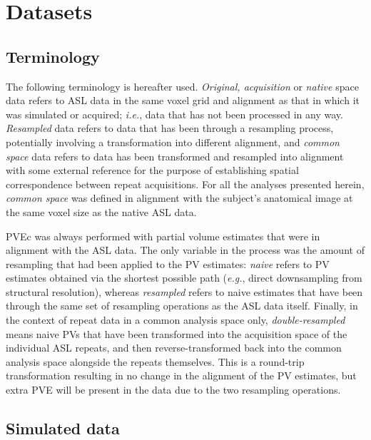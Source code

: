 \section{Datasets}

\subsection{Terminology}

The following terminology is hereafter used. \textit{Original, acquisition} or \textit{native} space data refers to ASL data in the same voxel grid and alignment as that in which it was simulated or acquired; \textit{i.e.}, data that has not been processed in any way. \textit{Resampled} data refers to data that has been through a resampling process, potentially involving a transformation into different alignment, and \textit{common space} data refers to data has been transformed and resampled into alignment with some external reference for the purpose of establishing spatial correspondence between repeat acquisitions. For all the analyses presented herein, \textit{common space} was defined in alignment with the subject's anatomical image at the same voxel size as the native ASL data. 

PVEc was always performed with partial volume estimates that were in alignment with the ASL data. The only variable in the process was the amount of resampling that had been applied to the PV estimates: \textit{naive} refers to PV estimates obtained via the shortest possible path (\textit{e.g.}, direct downsampling from structural resolution), whereas \textit{resampled} refers to naive estimates that have been through the same set of resampling operations as the ASL data itself. Finally, in the context of repeat data in a common analysis space only, \textit{double-resampled} means naive PVs that have been transformed into the acquisition space of the individual ASL repeats, and then reverse-transformed back into the common analysis space alongside the repeats themselves. This is a round-trip transformation resulting in no change in the alignment of the PV estimates, but extra PVE will be present in the data due to the two resampling operations.

\subsection{Simulated data}
\label{pvec_chapter_sim_data}

